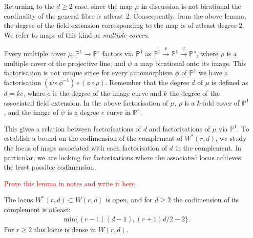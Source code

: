 Returning to the $d \geq 2$ case, since the map $\mu$ in discussion is not birational the cardinality of the general fibre is atleast $2$.
Consequently, from the above lemma, the degree of the field extension corresponding to the map is of atleast degree $2$.
We refer to maps of this kind as \textit{multiple covers}.
\par Every multiple cover $\mu: \mathbb{P}^{1} \to \mathbb{P}^{r}$ factors via $\mathbb{P}^{1}$ as $\mathbb{P}^{1} \xrightarrow{\rho} \mathbb{P}^{1} \xrightarrow{\psi} \mathbb{P}^{n} $, where $\rho$ is a multiple cover of the projective line, and $\psi$ a map birational onto its image.
This factorisation is not unique since for every automorphism $\phi$ of $\mathbb{P}^{1}$ we have a factorisation $(\psi \circ \phi^{-1}) \circ (\phi \circ \rho)$. 
Remember that the degree $d$ of $\mu$ is defined as $d = ke$, where $e$ is the degree of the image curve and $k$ the degree of the associated field extension.
In the above factorisation of $\mu$, $\rho$ is a $k$-fold cover of $\mathbb{P}^{1}$, and the image of $\psi$ is a degree $e$ curve in $\mathbb{P}^{r}$.
\par This gives a relation between factorisations of $d$ and factorisations of $\mu$ via $\mathbb{P}^{1}$. 
To establish a bound on the codimension of the complement of $W^{*}(r,d)$, we study the locus of maps associated with each factorisation of $d$ in the complement.
In particular, we are looking for factorisations where the associated locus achieves the least possible codimension.

\begin{lemma}
    \textcolor{red}{Prove this lemma in notes and write it here}
\end{lemma}

\begin{proposition}
    \label{birDim}
    The locus $W^{*}(r,d) \subset W(r,d)$ is open, and for $d \geq 2$ the codimension of its complement is atleast:
    \begin{align*}
        \text{min}\{(r-1)(d-1),(r+1)d/2 - 2\}.
    \end{align*}
    For $r \geq 2$ this locus is dense in $W(r,d)$.
\end{proposition}

%


